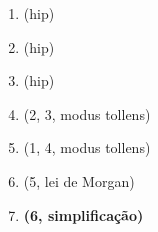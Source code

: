 \documentclass[a4paper, 12pt, addpoints]{exam}
\begin{document}
\begin{questions}
\begin{resp}
\begin{enumerate}[a)]
\begin{multicols}{2}
        \columnbreak

        \begin{enumerate}[\ding{32}]
          \item (hip)
          \item (hip)
          \item (hip)
          \item (2, 3, modus tollens)
          \item (1, 4, modus tollens)
          \item (5, lei de Morgan)
          \item \textbf{(6, simplificação)}
        \end{enumerate}

      \end{multicols}

    \end{enumerate}
  \end{resp}
  

\end{questions}
\end{document}
